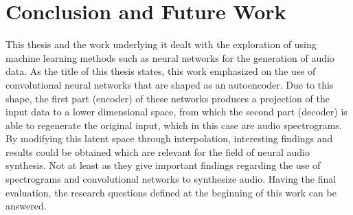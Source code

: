 \chapter{Conclusion and Future Work}
\label{cha:Conclusion}

This thesis and the work underlying it dealt with the exploration of using machine learning methods such as neural networks for the generation of audio data. As the title of this thesis states, this work emphasized on the use of convolutional neural networks that are shaped as an autoencoder. Due to this shape, the first part (encoder) of these networks produces a projection of the input data to a lower dimensional space, from which the second part (decoder) is able to regenerate the original input, which in this case are audio spectrograms. By modifying this latent space through interpolation, interesting findings and results could be obtained which are relevant for the field of neural audio synthesis. Not at least as they give important findings regarding the use of spectrograms and convolutional networks to synthesize audio. Having the final evaluation, the research questions defined at the beginning of this work can be answered.

